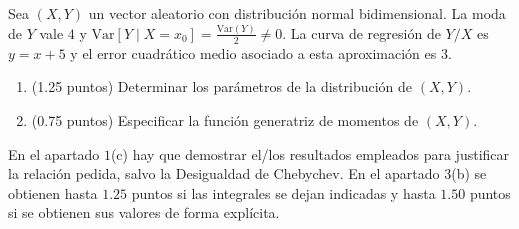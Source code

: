 \documentclass[12pt]{article}
\begin{document}
    \begin{ejercicio}[2 puntos]
        Sea $(X, Y)$ un vector aleatorio con distribución normal bidimensional. La moda de $Y$ vale $4$ y $\mathrm{Var}[Y \mid X = x_0] = \frac{\mathrm{Var}(Y)}{2} \neq 0$. La curva de regresión de $Y/X$ es $y = x + 5$ y el error cuadrático medio asociado a esta aproximación es $3$.
        \begin{enumerate}
            \item (1.25 puntos) Determinar los parámetros de la distribución de $(X, Y)$.
            \item (0.75 puntos) Especificar la función generatriz de momentos de $(X, Y)$.
        \end{enumerate}
    \end{ejercicio}

    \begin{observacion}
        En el apartado $1$(c) hay que demostrar el/los resultados empleados para justificar la relación pedida, salvo la Desigualdad de Chebychev.
        En el apartado $3$(b) se obtienen hasta $1.25$ puntos si las integrales se dejan indicadas y hasta $1.50$ puntos si se obtienen sus valores de forma explícita.
    \end{observacion}
\end{document}
